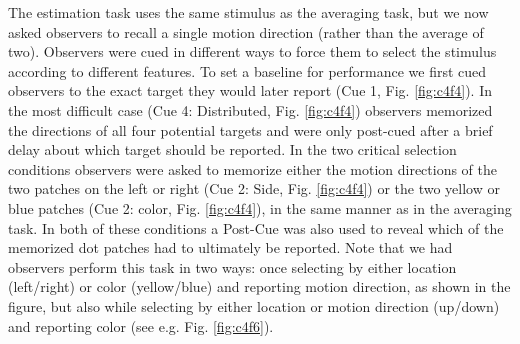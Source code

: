The estimation task uses the same stimulus as the averaging task, but we now asked observers to recall a single motion direction (rather than the average of two). Observers were cued in different ways to force them to select the stimulus according to different features. To set a baseline for performance we first cued observers to the exact target they would later report (Cue 1, Fig. \ref{fig:c4f4}). In the most difficult case (Cue 4: Distributed, Fig. \ref{fig:c4f4}) observers memorized the directions of all four potential targets and were only post-cued after a brief delay about which target should be reported. In the two critical selection conditions observers were asked to memorize either the motion directions of the two patches on the left or right (Cue 2: Side, Fig. \ref{fig:c4f4}) or the two yellow or blue patches (Cue 2: color, Fig. \ref{fig:c4f4}), in the same manner as in the averaging task. In both of these conditions a Post-Cue was also used to reveal which of the memorized dot patches had to ultimately be reported. Note that we had observers perform this task in two ways: once selecting by either location (left/right) or color (yellow/blue) and reporting motion direction, as shown in the figure, but also while selecting by either location or motion direction (up/down) and reporting color (see e.g. Fig. \ref{fig:c4f6}). 

